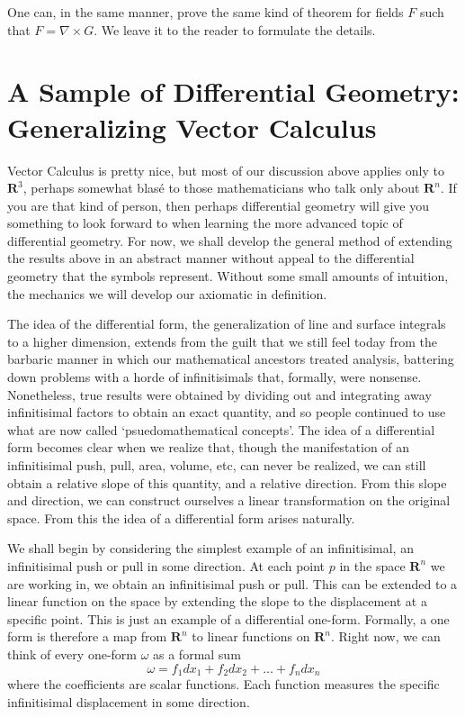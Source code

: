 \documentclass[12pt]{amsbook}
\theoremstyle{plain}
\theoremstyle{definition}
\begin{document}
One can, in the same manner, prove the same kind of theorem for fields $F$ such that $F = \nabla \times G$. We leave it to the reader to formulate the details.

\section{A Sample of Differential Geometry: Generalizing Vector Calculus}

Vector Calculus is pretty nice, but most of our discussion above applies only to $\mathbf{R}^3$, perhaps somewhat blas\'{e} to those mathematicians who talk only about $\mathbf{R}^n$. If you are that kind of person, then perhaps differential geometry will give you something to look forward to when learning the more advanced topic of differential geometry. For now, we shall develop the general method of extending the results above in an abstract manner without appeal to the differential geometry that the symbols represent. Without some small amounts of intuition, the mechanics we will develop our axiomatic in definition.

The idea of the differential form, the generalization of line and surface integrals to a higher dimension, extends from the guilt that we still feel today from the barbaric manner in which our mathematical ancestors treated analysis, battering down problems with a horde of infinitisimals that, formally, were nonsense. Nonetheless, true results were obtained by dividing out and integrating away infinitisimal factors to obtain an exact quantity, and so people continued to use what are now called `psuedomathematical concepts'. The idea of a differential form becomes clear when we realize that, though the manifestation of an infinitisimal push, pull, area, volume, etc, can never be realized, we can still obtain a relative slope of this quantity, and a relative direction. From this slope and direction, we can construct ourselves a linear transformation on the original space. From this the idea of a differential form arises naturally.

We shall begin by considering the simplest example of an infinitisimal, an infinitisimal push or pull in some direction. At each point $p$ in the space $\mathbf{R}^n$ we are working in, we obtain an infinitisimal push or pull. This can be extended to a linear function on the space by extending the slope to the displacement at a specific point. This is just an example of a differential one-form. Formally, a one form is therefore a map from $\mathbf{R}^n$ to linear functions on $\mathbf{R}^n$. Right now, we can think of every one-form $\omega$ as a formal sum
%
\[ \omega = f_1 dx_1 + f_2 dx_2 + \dots + f_n dx_n \]
%
where the coefficients are scalar functions. Each function measures the specific infinitisimal displacement in some direction.
\end{document}
